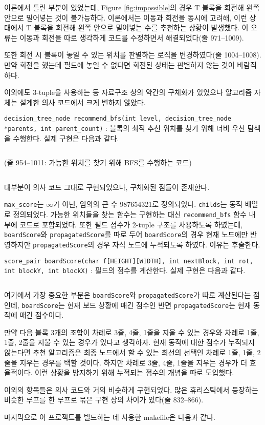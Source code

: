 이론에서 틀린 부분이 있었는데, Figure \ref{fig:impossible}의 경우 T 블록을 회전해 왼쪽 안으로 밀어넣는 것이 불가능하다. 이론에서는
이동과 회전을 동시에 고려해, 이런 상태에서 T 블록을 회전해 왼쪽 안으로 밀어넣는 수를 추천하는 상황이 발생했다. 이 오류는 이동과 회전을 따로 생각하게
코드를 수정하면서 해결되었다(줄 971--1009).

또한 회전 시 블록이 놓일 수 있는 위치를 판별하는 로직을 변경하였다(줄 1004--1008). 만약 회전을 했는데 필드에 놓일 수 없다면 회전된 상태는 판별하지
않는 것이 바람직하다.

이외에도 3-tuple을 사용하는 등 자료구조 상의 약간의 구체화가 있었으나 알고리즘 자체는 설계한 의사 코드에서 크게 변하지 않았다.

\texttt{decision_tree_node recommend_bfs(int level, decision_tree_node *parents, int parent_count)}
: 블록의 최적 추천 위치를 찾기 위해 너비 우선 탐색을 수행한다. 실제 구현은 다음과 같다.

\inputminted[xleftmargin=\parindent,linenos,firstline=916,lastline=953,breaklines]{c}{inc-sources/tetris.c}
(줄 954--1011: 가능한 위치를 찾기 위해 BFS를 수행하는 코드)
\inputminted[xleftmargin=\parindent,linenos,firstline=1012,lastline=1057,breaklines]{c}{inc-sources/tetris.c}

대부분이 의사 코드 그대로 구현되었으나, 구체화된 점들이 존재한다.

\texttt{max_score}는 $\infty$가 아닌, 임의의 큰 수 987654321로 정의되었다. \texttt{childs}는 동적 배열로 정의되었다.
가능한 위치들을 찾는 함수는 구현하는 대신 \texttt{recommend_bfs} 함수 내부에 코드로 포함되었다. 또한 필드 점수가 2-tuple 구조를 사용하도록 하였는데,
\texttt{boardScore}와 \texttt{propagatedScore}를 따로 두어 \texttt{boardScore}의 경우 현재 노드에만 반영하지만
\texttt{propagatedScore}의 경우 자식 노드에 누적되도록 하였다. 이유는 후술한다.

\texttt{score_pair boardScore(char f[HEIGHT][WIDTH], int nextBlock, int rot, int blockY, int blockX)}
: 필드의 점수를 계산한다. 실제 구현은 다음과 같다.

\inputminted[xleftmargin=\parindent,linenos,firstline=772,lastline=914,breaklines]{c}{inc-sources/tetris.c}

여기에서 가장 중요한 부분은 \texttt{boardScore}와 \texttt{propagatedScore}가 따로 계산된다는 점인데, \texttt{boardScore}는 현재 보드
상황에 매긴 점수인 반면 \texttt{propagatedScore}는 현재 동작에 매긴 점수이다.

만약 다음 블록 3개의 조합이 차례로 3줄, 4줄, 1줄을 지울 수 있는 경우와 차례로 1줄, 1줄, 2줄을 지울 수 있는 경우가 있다고 생각하자.
현재 동작에 대한 점수가 누적되지 않는다면 추천 알고리즘은 최종 노드에서 할 수 있는 최선의 선택인 차례로 1줄, 1줄, 2줄을 지우는 경우를 택할 것이다.
하지만 차례로 3줄, 4줄, 1줄을 지우는 경우가 더 효율적이다. 이런 상황을 방지하기 위해 누적되는 점수의 개념을 따로 도입했다.

이외의 항목들은 의사 코드와 거의 비슷하게 구현되었다. 많은 휴리스틱에서 등장하는 비슷한 루프를 한 루프로 묶은 구현 상의 차이가 있다(줄 832--866).

마지막으로 이 프로젝트를 빌드하는 데 사용한 makefile은 다음과 같다.

\inputminted[xleftmargin=\parindent,linenos,breaklines]{makefile}{inc-sources/makefile}